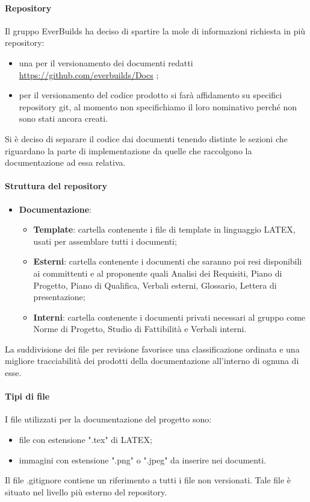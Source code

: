 			\paragraph{Repository}
				Il gruppo EverBuilds ha deciso di spartire la mole di informazioni richiesta in più repository:
				\begin{itemize}
					\item una per il versionamento dei documenti redatti \url{https://github.com/everbuilds/Docs} ;
					\item per il versionamento del codice prodotto si farà affidamento su specifici repository git, al momento non specifichiamo il loro nominativo perché non sono stati ancora creati.
				\end{itemize}
				Si è deciso di separare il codice dai documenti tenendo distinte le sezioni che riguardano la parte di implementazione da quelle che raccolgono la documentazione ad essa relativa.\\
			\paragraph{Struttura del repository}
				\begin{itemize}
					\item\textbf{Documentazione}:
						\begin{itemize}
							\item\textbf{Template}: cartella contenente i file di template in linguaggio LATEX, usati per assemblare tutti i documenti;
							\item\textbf{Esterni}: cartella contenente i documenti che saranno poi resi disponibili ai committenti e al proponente quali Analisi dei Requisiti, Piano di Progetto, Piano di Qualifica, Verbali esterni, Glossario, Lettera di presentazione;
							\item\textbf{Interni}: cartella contenente i documenti privati necessari al gruppo come Norme di Progetto, Studio di Fattibilità e Verbali interni.
							
						\end{itemize}
				\end{itemize}
				La suddivisione dei file per revisione favorisce una classificazione ordinata e una migliore tracciabilità dei prodotti della documentazione all’interno di ognuna di esse.
			\paragraph{Tipi di file}
				I file utilizzati per la documentazione del progetto sono:
				\begin{itemize}
					\item file con estensione ".tex" di LATEX;
					\item immagini con estensione ".png" o ".jpeg" da inserire nei documenti.
				\end{itemize}
				Il file .gitignore contiene un riferimento a tutti i file non versionati. Tale file è situato nel livello più esterno del repository.
